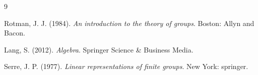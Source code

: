 \documentclass[a4paper, 17pt]{extarticle}
\begin{document}
{\small 
 
 
 
 
 
 
 
 
 
 
 


\begin{thebibliography}{9}


Rotman, J. J. (1984). \emph{An introduction to the theory of groups}. Boston: Allyn and Bacon.

Lang, S. (2012). \emph{Algebra}. Springer Science \& Business Media.

Serre, J. P. (1977). \emph{Linear representations of finite groups}. New York: springer.

\end{thebibliography}

}

\end{document}
